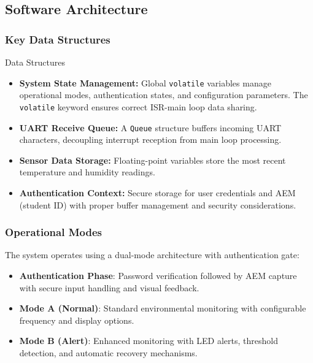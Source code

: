 \documentclass[12pt,a4paper]{article}
\begin{document}
\subsection{Software Architecture}

\subsubsection{Key Data Structures}

\begin{mytitledbox}{Data Structures}
\begin{itemize}[label=\textcolor{myblue}{$\circ$}, itemsep=1.5mm]
    \item \textbf{System State Management:} Global \texttt{volatile} variables manage operational modes, authentication states, and configuration parameters. The \texttt{volatile} keyword ensures correct ISR-main loop data sharing.

    \item \textbf{UART Receive Queue:} A \texttt{Queue} structure buffers incoming UART characters, decoupling interrupt reception from main loop processing.

    \item \textbf{Sensor Data Storage:} Floating-point variables store the most recent temperature and humidity readings.

    \item \textbf{Authentication Context:} Secure storage for user credentials and AEM (student ID) with proper buffer management and security considerations.
\end{itemize}
\end{mytitledbox}

\subsubsection{Operational Modes}
The system operates using a dual-mode architecture with authentication gate:

\begin{tcolorbox}[mybox]
\begin{itemize}[label=\textcolor{myblue}{$\blacktriangleright$}, itemsep=1.5mm]
    \item \textbf{Authentication Phase}: Password verification followed by AEM capture with secure input handling and visual feedback.
    \item \textbf{Mode A (Normal)}: Standard environmental monitoring with configurable frequency and display options.
    \item \textbf{Mode B (Alert)}: Enhanced monitoring with LED alerts, threshold detection, and automatic recovery mechanisms.
\end{itemize}
\end{tcolorbox}
\end{document}
